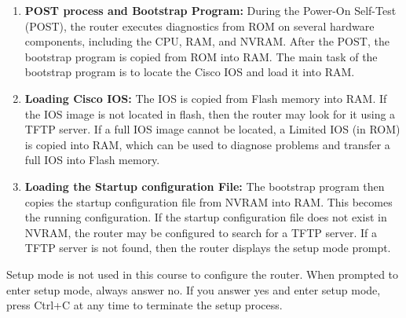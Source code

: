 \begin{enumerate}
\item \textbf{POST process and Bootstrap Program:} During the Power-On Self-Test (POST), the router executes diagnostics from ROM on several hardware components, including the CPU, RAM, and NVRAM. After the POST, the bootstrap program is copied from ROM into RAM. The main task of the bootstrap program is to locate the Cisco IOS and load it into RAM.

\item \textbf{Loading Cisco IOS:} The IOS is copied from Flash memory into RAM. If the IOS image is not located in flash, then the router may look for it using a TFTP server. If a full IOS image cannot be located, a Limited IOS (in ROM) is copied into RAM, which can be used to diagnose problems and transfer a full IOS into Flash memory.

\item \textbf{Loading the Startup configuration File:} The bootstrap program then copies the startup configuration file from NVRAM into RAM. This becomes the running configuration. If the startup configuration file does not exist in NVRAM, the router may be configured to search for a TFTP server. If a TFTP server is not found, then the router displays the setup mode prompt.
\end{enumerate}

\note Setup mode is not used in this course to configure the router. When prompted to enter setup mode, always answer no. If you answer yes and enter setup mode, press Ctrl+C at any time to terminate the setup process.\\

